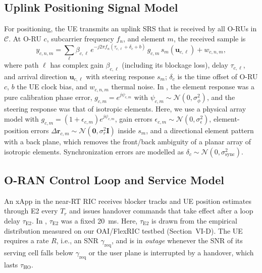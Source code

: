 \documentclass[journal]{IEEEtran}
\newenvironment{proposed}{\color{propcol}}{}
\begin{document}
\subsection{Uplink Positioning Signal Model}
For positioning, the UE transmits an uplink SRS that is received by all
O-RUs in $\mathcal C$. At O-RU $c$, subcarrier frequency $f_n$, and
element $m$, the received sample is
\begin{equation}
y_{c,n,m}=\sum_{\ell}\beta_{c,\ell}\,
e^{-j2\pi f_n(\tau_{c,\ell}+\delta_c+b)}\,
g_{c,m}\,s_m(\mathbf u_{c,\ell})+w_{c,n,m},
\label{eq:signal}
\end{equation}
where path $\ell$ has complex gain $\beta_{c,\ell}$ (including its
blockage loss), delay $\tau_{c,\ell}$, and arrival direction
$\mathbf u_{c,\ell}$ with steering response $s_m$; $\delta_c$ is the time
offset of O-RU $c$, $b$ the UE clock bias, and $w_{c,n,m}$ thermal noise.
In \cite{natanzi2027wcncB}, the element response was a pure calibration
phase error, $g_{c,m}=e^{j\psi_{c,m}}$ with
$\psi_{c,m}\sim\mathcal N(0,\sigma_\phi^2)$, and the steering response
was that of isotropic elements.
\begin{proposed}
Here, we use a physical array model with
$g_{c,m}=(1+\epsilon_{c,m})e^{j\psi_{c,m}}$, gain errors
$\epsilon_{c,m}\sim\mathcal N(0,\sigma_\epsilon^2)$, element-position
errors $\Delta\mathbf r_{c,m}\sim\mathcal N(\mathbf 0,\sigma_r^2\mathbf I)$
inside $s_m$, and a directional element pattern with a back plane, which
removes the front/back ambiguity of a planar array of isotropic
elements.
\end{proposed}
Synchronization errors are modelled as
$\delta_c\sim\mathcal N(0,\sigma_{\mathrm{sync}}^2)$.

\subsection{O-RAN Control Loop and Service Model}
An xApp in the near-RT RIC receives blocker tracks and UE position
estimates through E2 every $T_r$ and issues handover commands that take
effect after a loop delay $\tau_{\mathrm{E2}}$. In
\cite{natanzi2027wcncA,natanzi2027wcncB}, $\tau_{\mathrm{E2}}$ was a fixed
\SI{20}{ms}. \textcolor{propcol}{Here, $\tau_{\mathrm{E2}}$ is drawn from
the empirical distribution measured on our OAI/FlexRIC testbed
(Section~VI-D).} The UE requires a rate $R$, i.e., an SNR
$\gamma_{\mathrm{req}}$, and is in \emph{outage} whenever the SNR of its
serving cell falls below $\gamma_{\mathrm{req}}$ or the user plane is
interrupted by a handover, which lasts $\tau_{\mathrm{HO}}$.
\end{document}
